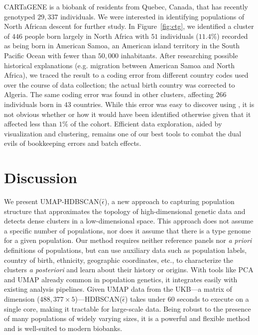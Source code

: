 CARTaGENE is a biobank of residents from Quebec, Canada, that has recently genotyped $29,337$ individuals\citep{awadalla_cohort_2013}. We were interested in identifying populations of North African descent for further study. In Figure~\ref{fig:ctg}, we identified a cluster of $446$ people born largely in North Africa with $51$ individuals ($11.4\%$) recorded as being born in American Samoa, an American island territory in the South Pacific Ocean with fewer than $50,000$ inhabitants. After researching possible historical explanations (e.g. migration between American Samoa and North Africa), we traced the result to a coding error from different country codes used over the course of data collection; the actual birth country was corrected to Algeria. The same coding error was found in other clusters, affecting $266$ individuals born in $43$ countries. While this error was easy to discover using \hdbe, it is not obvious whether or how it would have been identified otherwise given that it affected less than $1\%$ of the cohort. Efficient data exploration, aided by visualization and clustering, remains one of our best tools to combat the dual evils of bookkeeping errors and batch effects.

\section{Discussion}

We present UMAP-HDBSCAN($\hat{\epsilon}$), a new approach to capturing population structure that approximates the topology of high-dimensional genetic data and detects dense clusters in a low-dimensional space. This approach does not assume a specific number of populations, nor does it assume that there is a type genome for a given population. Our method requires neither reference panels nor \emph{a priori} definitions of populations, but can use auxiliary data such as population labels, country of birth, ethnicity, geographic coordinates, etc., to characterize the clusters \emph{a posteriori} and learn about their history or origins. With tools like PCA and UMAP already common in population genetics\citep{diaz-papkovich_review_2021}, it integrates easily with existing analysis pipelines. Given UMAP data from the UKB---a matrix of dimension ($488,377 \times 5$)---HDBSCAN($\hat{\epsilon}$) takes under $60$ seconds to execute on a single core, making it tractable for large-scale data. Being robust to the presence of many populations of widely varying sizes, it is a powerful and flexible method and is well-suited to modern biobanks.

